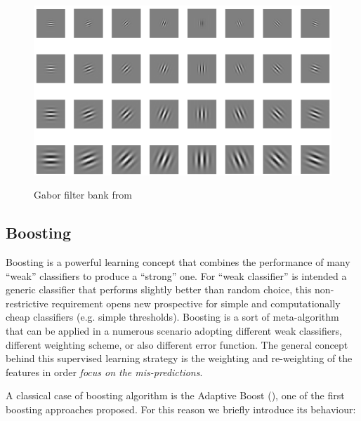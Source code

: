 \begin{figure}[!h]
\centering
\includegraphics[width=12cm]{images/gabor.png}
\label{fig:gabor}
\caption{Gabor filter bank from \cite{gaborApplication} }
 \end{figure}


\newpage
\subsection{Boosting}
\label{appr:boosting}

Boosting is a powerful learning concept that combines the performance of many ``weak'' classifiers to produce a ``strong'' one. For ``weak classifier'' is intended a generic classifier that performs slightly better than random choice, this non-restrictive requirement opens new prospective for simple and computationally cheap classifiers (e.g. simple thresholds). Boosting is a sort of meta-algorithm that can be applied in a numerous scenario adopting different weak classifiers, different weighting scheme, or also different error function. The general concept behind this supervised learning strategy is the weighting and re-weighting of the features in order \emph{focus on the mis-predictions}\cite{rojas2009adaboost}.

A classical case of boosting algorithm is the Adaptive Boost ()\cite{Friedman98additivelogistic}, one of the first boosting approaches proposed. For this reason we briefly introduce its behaviour:

